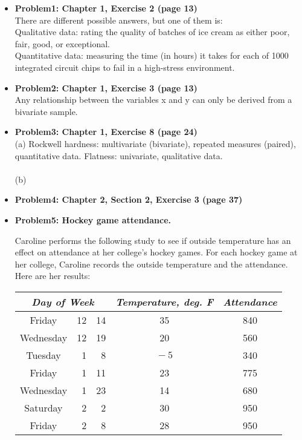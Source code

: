 \documentclass[11pt]{article}\usepackage[]{graphicx}\usepackage[]{color}
\begin{document}
\pagestyle{fancy} 
\begin{itemize}

\item \textbf{Problem1: Chapter 1, Exercise 2 (page 13)} \\
There are different possible answers, but one of them is:\\
Qualitative data: rating the quality of batches of ice cream as either poor, fair, good, or exceptional.\\
Quantitative data: measuring the time (in hours) it takes for each of 1000 integrated circuit chips to fail in a high-stress environment.


\item \textbf{Problem2: Chapter 1, Exercise 3 (page 13)}\\
Any relationship between the variables x and y can only be derived from a bivariate sample. \\

\item \textbf{Problem3: Chapter 1, Exercise 8 (page 24)}\\
(a) Rockwell hardness: multivariate (bivariate), repeated measures (paired), quantitative data. Flatness: univariate, qualitative data.\\
\\
(b)
\item \textbf{Problem4: Chapter 2, Section 2, Exercise 3 (page 37)}\\


\item \textbf{Problem5: Hockey game attendance.}

Caroline performs the following study to see if outside temperature
has an effect on attendance at her college's hockey games. For each
hockey game at her college, Caroline records the outside temperature and the attendance. Here are her results:

\hspace{1in}
\begin{tabular}{|cr@{/}r|c|c|} \hline
\multicolumn{3}{|c|}{\emph{Day of Week}} & \emph{Temperature, deg. F} & \emph{Attendance} \\ \hline
Friday & 12&14 & 35 & 840 \\
Wednesday & 12&19 & 20 & 560 \\
Tuesday & 1&8 & $\!-5$ & 340 \\
Friday & 1&11 & 23 & 775 \\
Wednesday & 1&23 & 14 & 680 \\
Saturday & 2&2 & 30 & 950 \\
Friday & 2&8 & 28 & 950 \\
\hline
\end{tabular}
 

\end{itemize}
\end{document}
